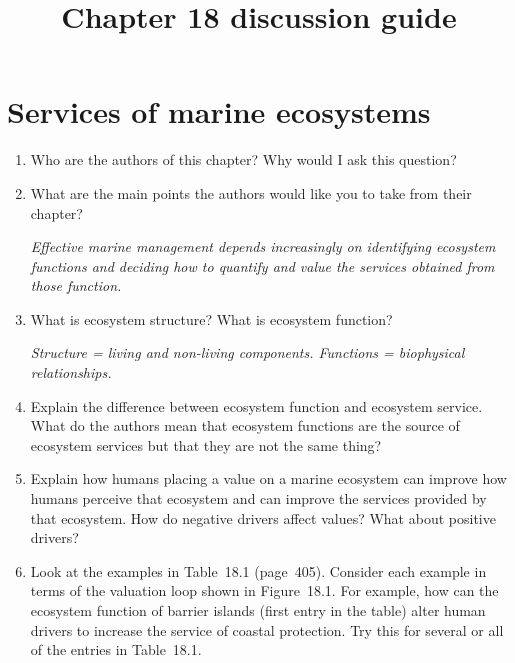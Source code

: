\documentclass[letterpaper]{tufte-handout}
\title{Chapter 18 discussion guide}
\date{} %
\begin{document}
\maketitle	%

\section*{Services of marine ecosystems}

\begin{enumerate}

	\item Who are the authors of this chapter? Why would I ask this question?%
	
	\item What are the main points the authors would like you to take from their chapter? 
	
	\textit{Effective marine management depends increasingly on identifying ecosystem functions and deciding how to quantify and value the services obtained from those function. }
	
	\item What is ecosystem structure? What is ecosystem function?
	
	\textit{Structure = living and non-living components. Functions = biophysical relationships.}
	
	\item Explain the difference between ecosystem function and ecosystem service.
	What do the authors mean that ecosystem functions are the source of 
	ecosystem services but that they are not the same thing?
	
	\item Explain%
	how humans placing a value on a marine ecosystem can improve how 
	humans perceive that ecosystem and can improve the services provided by that
	ecosystem. How do negative drivers affect values? What about positive drivers?
	
	\item Look at the examples in Table~18.1 (page~405). Consider each example
	in terms of the valuation loop shown in Figure~18.1. For example, how
	can the ecosystem function of barrier islands (first entry in the table)
	alter human drivers to increase the service of coastal protection. Try this
	for several or all of the entries in Table~18.1.
	

\end{enumerate}
\end{document}
